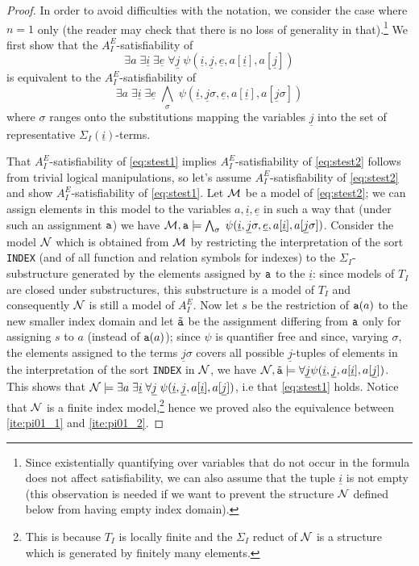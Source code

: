\documentclass{LMCS}
\newcommand{\ue}{\ensuremath{\underline e}}
\newcommand{\ui}{\ensuremath{\underline i}}
\newcommand{\uj}{\ensuremath{\underline j}}
\newcommand{\cM}{\ensuremath \mathcal M}
\newcommand{\cN}{\ensuremath \mathcal N}
\theoremstyle{plain}\newtheorem{assumption}[thm]{Assumption}
\theoremstyle{plain}\newtheorem{proposition}[thm]{Proposition}
\theoremstyle{plain}\newtheorem{property}[thm]{Property}
\theoremstyle{plain}\newtheorem{example}[thm]{Example}
\theoremstyle{plain}\newtheorem{claim}[thm]{Claim}
\theoremstyle{plain}\newtheorem{lemma}[thm]{Lemma}
\begin{document}
\begin{proof}
  In order to avoid difficulties with the notation, we consider the
  case where $n=1$ only (the reader may check that there is no loss of
  generality in that).\footnote{Since existentially quantifying over
    variables that do not occur in the formula does not affect
    satisfiability, we can also assume that the tuple $\ui$ is not
    empty (this observation is needed if we want to prevent the
    structure $\cN$ defined below from having empty index domain).} We
  first show that the $A^E_I$-satisfiability of
  \begin{equation}\label{eq:stest1}
    \exists a\; \exists \ui\; \exists \ue\;\forall \uj \; \psi(\ui, \uj,\ue, a[\ui],a[\uj])
  \end{equation}
  is equivalent to the $A^E_I$-satisfiability of
  \begin{equation}\label{eq:stest2}
    \exists a\; \exists \ui\;\exists \ue\; \bigwedge_{\sigma}\; \psi(\ui, \uj\sigma, \ue, a[\ui],a[\uj\sigma])
  \end{equation}
  where $\sigma$ ranges onto the substitutions mapping the variables
  $\uj$ into the set of representative $\Sigma_I(\ui)$-terms.

  That $A^E_I$-satisfiability of \eqref{eq:stest1} implies
  $A^E_I$-satisfiability of \eqref{eq:stest2} follows from trivial
  logical manipulations, so let's assume $A^E_I$-satisfiability of
  \eqref{eq:stest2} and show $A^E_I$-satisfiability of
  \eqref{eq:stest1}. Let $\cM$ be a model of \eqref{eq:stest2}; we can
  assign elements in this model to the variables $a, \ui, \ue$ in such
  a way that (under such an assignment ${\tt a}$) we have $\cM, {\tt
    a}\models \bigwedge_{\sigma}\; \psi(\ui, \uj\sigma, \ue,
  a[\ui],a[\uj\sigma])$. Consider the model $\cN$ which is obtained
  from $\cM$ by restricting the interpretation of the sort {\tt INDEX}
  (and of all function and relation symbols for indexes) to the
  $\Sigma_I$-substructure generated by the elements assigned by ${\tt
    a}$ to the $\ui$: since models of $T_I$ are closed under
  substructures, this substructure is a model of $T_I$ and
  consequently $\cN$ is still a model of $A^E_I$. Now let $s$ be the
  restriction of ${\tt a}(a)$ to the new smaller index domain and let
  $\tilde {\tt a}$ be the assignment differing from ${\tt a}$ only for
  assigning $s$ to $a$ (instead of ${\tt a}(a)$); since $\psi$ is
  quantifier free and since, varying $\sigma$, the elements assigned
  to the terms $\uj\sigma$ covers all possible $\uj$-tuples of
  elements in the interpretation of the sort {\tt INDEX} in $\cN$, we
  have $\cN, \tilde {\tt a}\models \forall \uj \psi(\ui, \uj, a[\ui],
  a[\uj])$. This shows that $\cN \models \exists a\; \exists \ui\;
  \forall \uj \; \psi(\ui, \uj, a[\ui],a[\uj])$, i.e that
  \eqref{eq:stest1} holds. Notice that $\cN$ is a finite index
  model,\footnote{This is because $T_I$ is locally finite and the
    $\Sigma_I$ reduct of $\cN$ is a structure which is generated by
    finitely many elements.} hence we proved also the equivalence
  between \eqref{ite:pi01_1} and \eqref{ite:pi01_2}.
 

\end{proof}
\end{document}
